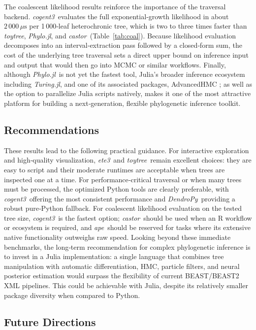 \documentclass[11pt, a4paper]{article}
\newcommand{\ape}{\textit{ape}}
\newcommand{\dendropy}{\textit{DendroPy}}
\newcommand{\cogent}{\textit{cogent3}}
\newcommand{\ete}{\textit{ete3}}
\newcommand{\toytree}{\textit{toytree}}
\newcommand{\phylo}{\textit{Phylo.jl}}
\newcommand{\castor}{\textit{castor}}
\newcommand{\turing}{\textit{Turing.jl}}
\begin{document}
The coalescent likelihood results reinforce the importance of the traversal backend.  \cogent\ evaluates the full exponential‑growth likelihood in about $2\,000\,\mu\text{s}$ per 1\,000‑leaf heterochronic tree, which is two to three times faster than \toytree, \phylo, and \castor\ (Table~\ref{tab:coal}).  Because likelihood evaluation decomposes into an interval‑extraction pass followed by a closed‑form sum, the cost of the underlying tree traversal sets a direct upper bound on inference input and output that would then go into MCMC or similar workflows.  Finally, although \phylo\ is not yet the fastest tool, Julia's broader inference ecosystem including \turing, and one of its associated packages, AdvancedHMC \cite{xu2020advancedhmc}; as well as the option to parallelize Julia scripts natively, makes it one of the most attractive platform for building a next‑generation, flexible phylogenetic inference toolkit. 

\subsection{Recommendations}

These results lead to the following practical guidance.  For interactive
exploration and high‑quality visualization, \ete\ and \toytree\ remain excellent choices: they are easy to script and their moderate runtimes are acceptable when trees are inspected one at a time. For
performance‑critical traversal or when many trees must be processed, the
optimized Python tools are clearly preferable, with \cogent\ offering the
most consistent performance and \dendropy\ providing a robust pure‑Python
fallback. For coalescent likelihood evaluation on the tested tree size,
\cogent\ is the fastest option; \castor\ should be used when an R workflow or ecosystem is required, and \ape\ should be reserved for tasks where its extensive native functionality outweighs raw speed.  Looking beyond these immediate benchmarks, the long‑term recommendation for complex phylogenetic inference is to invest in a Julia implementation: a single language that combines tree manipulation with automatic differentiation, HMC, particle filters, and neural posterior estimation would surpass the flexibility of current BEAST/BEAST2 XML pipelines. This could be achievable with Julia, despite its relatively smaller package diversity when compared to Python. 
\bigskip
\subsection{Future Directions}
\end{document}
